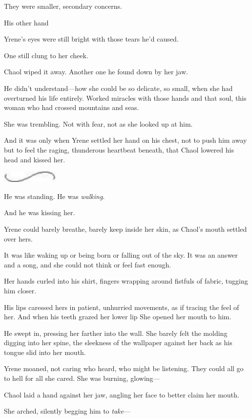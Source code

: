 They were smaller, secondary concerns.

His other hand 

Yrene's eyes were still bright with those tears he'd caused.

One still clung to her cheek.

Chaol wiped it away. Another one he found down by her jaw.

He didn't understand---how she could be so delicate, so small, when she had overturned his life entirely. Worked miracles with those hands and that soul, this woman who had crossed mountains and seas.

She was trembling. Not with fear, not as she looked up at him.

And it was only when Yrene settled her hand on his chest, not to push him away but to feel the raging, thunderous heartbeat beneath, that Chaol lowered his head and kissed her.

\includegraphics[width=1.12in,height=0.24in]{images/seperator}

He was standing. He was \emph{walking}.

And he was kissing her.

Yrene could barely breathe, barely keep inside her skin, as Chaol's mouth settled over hers.

It was like waking up or being born or falling out of the sky. It was an answer and a song, and she could not think or feel fast enough.

Her hands curled into his shirt, fingers wrapping around fistfuls of fabric, tugging him closer.

His lips caressed hers in patient, unhurried movements, as if tracing the feel of her. And when his teeth grazed her lower lip  She opened her mouth to him.

He swept in, pressing her farther into the wall. She barely felt the molding digging into her spine, the sleekness of the wallpaper against her back as his tongue slid into her mouth.

Yrene moaned, not caring who heard, who might be listening. They could all go to hell for all she cared. She was burning, glowing---

Chaol laid a hand against her jaw, angling her face to better claim her mouth.

She arched, silently begging him to \emph{take}---

